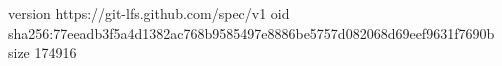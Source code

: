 version https://git-lfs.github.com/spec/v1
oid sha256:77eeadb3f5a4d1382ac768b9585497e8886be5757d082068d69eef9631f7690b
size 174916
